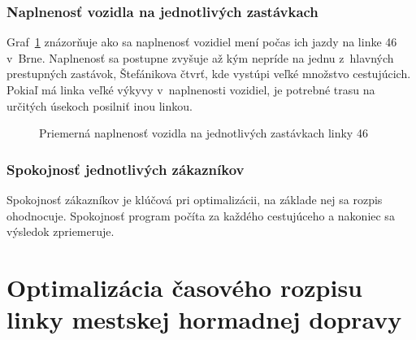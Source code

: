 \subsection*{Naplnenosť vozidla na jednotlivých zastávkach}
Graf~\ref{fig:averageLoad} znázorňuje ako sa naplnenosť vozidiel mení počas ich jazdy na linke 46 v~Brne.
Naplnenosť sa postupne zvyšuje až kým nepríde na jednu z~hlavných prestupných zastávok, Štefánikova čtvrť, kde vystúpi veľké množstvo cestujúcich.
Pokiaľ má linka veľké výkyvy v~naplnenosti vozidiel, je potrebné trasu na určitých úsekoch posilniť inou linkou.
\begin{figure}[h]\label{fig:averageLoad}
  \centering
  \caption{Priemerná naplnenosť vozidla na jednotlivých zastávkach linky 46}
\end{figure}

\subsection*{Spokojnosť jednotlivých zákazníkov}
Spokojnosť zákazníkov je klúčová pri optimalizácii, na základe nej sa rozpis ohodnocuje.
Spokojnosť program počíta za každého cestujúceho a nakoniec sa výsledok zpriemeruje.

\chapter{Optimalizácia časového rozpisu linky mestskej hormadnej dopravy}\label{optimalizacia}

